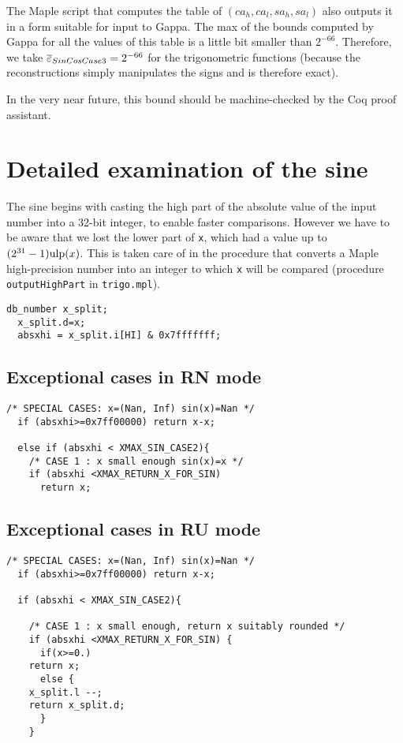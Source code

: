 The Maple script that computes the table of $(ca_h,ca_l,sa_h,sa_l)$
also outputs it in a form suitable for input to Gappa.  The max of the
bounds computed by Gappa for all the values of this table is a little
bit smaller than $2^{-66}$. Therefore, we take
${\overline{\varepsilon}}_{SinCosCase3}=2^{-66}$ for the trigonometric functions (because the
reconstructions simply manipulates the signs and is therefore exact).

In the very near future, this bound should be machine-checked by the
Coq proof assistant.



\section{Detailed examination of the sine}

The sine begins with casting the high part of the absolute value of
the input number into a 32-bit integer, to enable faster comparisons.
However we have to be aware that we lost the lower part of \texttt{x},
which had a value up to $(2^{31}-1)\mbox{ulp}(x)$. This is taken care of in
the procedure that converts a Maple high-precision number into an
integer to which \texttt{x} will be compared (procedure
\texttt{outputHighPart} in \texttt{trigo.mpl}).

\begin{lstlisting}[caption={Casting to an int for faster comparisons \label{lst:trigo:takehighpart}},firstnumber=1]
  db_number x_split;
  x_split.d=x;
  absxhi = x_split.i[HI] & 0x7fffffff;
\end{lstlisting}


\subsection{Exceptional cases in RN mode}
\begin{lstlisting}[caption={Exceptional cases for sine RN},firstnumber=1]
  /* SPECIAL CASES: x=(Nan, Inf) sin(x)=Nan */
  if (absxhi>=0x7ff00000) return x-x;    
   
  else if (absxhi < XMAX_SIN_CASE2){
    /* CASE 1 : x small enough sin(x)=x */
    if (absxhi <XMAX_RETURN_X_FOR_SIN)
      return x;
\end{lstlisting}

\subsection{Exceptional cases in RU mode}
\begin{lstlisting}[caption={Exceptional cases for sine RU},firstnumber=1]
  /* SPECIAL CASES: x=(Nan, Inf) sin(x)=Nan */
  if (absxhi>=0x7ff00000) return x-x;    
  
  if (absxhi < XMAX_SIN_CASE2){

    /* CASE 1 : x small enough, return x suitably rounded */
    if (absxhi <XMAX_RETURN_X_FOR_SIN) {
      if(x>=0.)
	return x;
      else {
	x_split.l --;
	return x_split.d;
      }
    }
\end{lstlisting}
